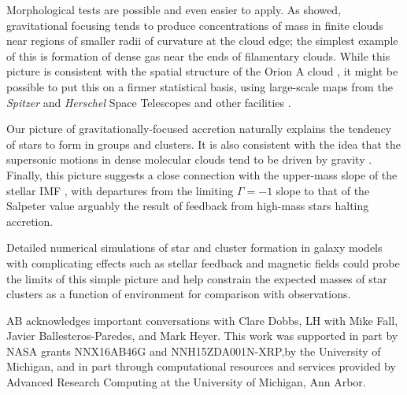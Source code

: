 \documentclass[iop]{emulateapj}
\begin{document}
Morphological tests are possible and even easier
to apply.  As \citet{bh04} showed, gravitational focusing tends to produce
concentrations of mass in finite clouds near regions of smaller radii of curvature at the
cloud edge; the simplest example of this is formation of dense gas near the ends of filamentary
clouds. While this picture is consistent with the spatial structure of the Orion A cloud \citep{hb07},
it might be possible to put this on a firmer statistical basis, using large-scale maps from the {\em Spitzer}
and {\em Herschel} Space Telescopes and other facilities
\citep{churchwell09,andre10,mairs16}.

Our picture of gravitationally-focused accretion naturally explains the tendency of stars to form in groups and clusters.  It is also consistent with the idea that
the supersonic motions in dense molecular clouds tend to be driven by gravity \citep{bp11}.  Finally, this picture suggests a close connection with the upper-mass slope of the stellar IMF \citep{ballesteros15}, with departures from the
limiting $\Gamma = -1$ slope to that of the Salpeter value arguably the result of feedback from high-mass stars halting accretion.


Detailed numerical simulations of star and cluster formation in galaxy models with
complicating effects such as stellar feedback and magnetic fields could probe the
limits of this simple picture and help constrain the expected masses of star clusters as a function
of environment for comparison with observations.

\acknowledgments

AB acknowledges important conversations with Clare Dobbs, LH with
Mike Fall, Javier Ballesteros-Paredes, and Mark Heyer.
This work was supported in part by NASA grants NNX16AB46G and NNH15ZDA001N-XRP,by the University of Michigan, and in part through computational resources and
services provided by Advanced Research Computing at the University of
Michigan, Ann Arbor.
\end{document}
